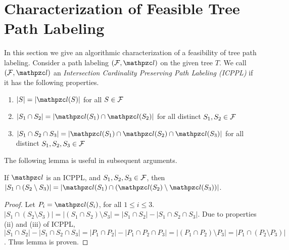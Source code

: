 \section{Characterization of Feasible Tree Path Labeling}
\label{sec:feasible}

In this section we give an algorithmic characterization of a
feasibility of tree path labeling.  Consider a path labeling $(\cF,
\cl)$ on the given tree $T$. We call $(\cF, \cl)$ an {\em Intersection
  Cardinality Preserving Path Labeling (ICPPL)} if it has the
following properties.

\begin{enumerate}[{(\icpplpr\ }i)]
\item \label{pr:i} $|S| = |\cl(S)|$ for all $S \in {\cal F}$
\item \label{pr:ii}$|S_1 \cap S_2| = |\cl(S_1) \cap \cl(S_2)|$ for all distinct $S_1, S_2 \in {\cal F}$
\item \label{pr:iii}$|S_1 \cap S_2 \cap S_3| = |\cl(S_1) \cap \cl(S_2)
  \cap \cl(S_3)|$ for all distinct $S_1, S_2, S_3 \in {\cal F}$
\end{enumerate}


The following lemma is useful in subsequent arguments.
\begin{lemma}
  \label{lem:setminuscard}
  If $\cl$ is an ICPPL, and $S_1, S_2, S_3 \in {\cal F}$, then $|S_1 \cap
  (S_2 \setminus S_3)| = |\cl(S_1) \cap (\cl(S_2) \setminus
  \cl(S_3))|$.
\end{lemma}
\begin{proof}%
  Let $P_i = \cl(S_i)$, for all $1 \le i \le 3$.  $|S_1 \cap (S_2
  \setminus S_3)| = |(S_1 \cap S_2) \setminus S_3| = |S_1 \cap S_2| -
  |S_1 \cap S_2 \cap S_3|$. Due to properties (ii) and (iii) of ICPPL,
  $|S_1 \cap S_2| - |S_1 \cap S_2 \cap S_3| = |P_1 \cap P_2| - |P_1
  \cap P_2 \cap P_3| = |(P_1 \cap P_2) \setminus P_3| = |P_1 \cap (P_2
  \setminus P_3)|$. Thus lemma is proven. %
\end{proof}


